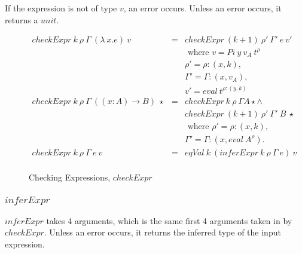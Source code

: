 If the expression is not of type $v$, an error occurs. Unless an error occurs, it returns a $unit$.

\begin{figure}[H]
  \begin{equation*}
    \begin{aligned}
      checkExpr \: k \: \rho \: \Gamma \: (\lambda \: x.e) \: v  & = & checkExpr \: (k + 1) \: \rho' \: \Gamma' \:e \: v'          \\
                                                                 &   & \textrm{ where } v = Pi \: y \: v_A \: t^{\rho}             \\
                                                                 &   & \rho' = \rho : (x, k),                                      \\
                                                                 &   & \Gamma' = \Gamma : (x, v_A),                                \\
                                                                 &   & v' = eval \: t^{\rho:(y, k)}                                \\
      checkExpr \: k \: \rho \: \Gamma \: ((x:A) \to B) \: \star & = & checkExpr \: k \: \rho \: \Gamma A \star              \land \\
                                                                 &   & checkExpr \: (k+1) \: \rho' \: \Gamma' \: B \: \star        \\
                                                                 &   & \textrm{ where } \rho' = \rho : (x, k),                     \\
                                                                 &   & \Gamma' = \Gamma:(x, eval \: A^{\rho}).                     \\
      checkExpr \: k \: \rho \: \Gamma \: e \: v                 & = & eqVal \: k \: (inferExpr \: k \: \rho \: \Gamma \: e) \: v  \\
    \end{aligned}
  \end{equation*}
  \caption{Checking Expressions, $checkExpr$}
\end{figure}

\subsubsection{$inferExpr$}

$inferExpr$ takes 4 arguments, which is the same first 4 arguments taken in by $checkExpr$. Unless an error occurs, it returns the inferred type of the input expression.

